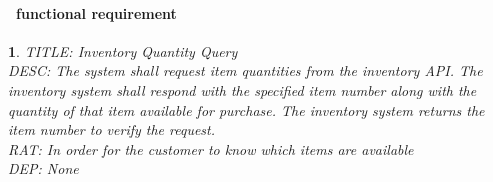 \documentclass{scrreprt}
\theoremstyle{funreq}
\newtheorem{funreq}{}
\newcommand*{\reqref}[1]{\hyperref[#1]{FR\ref*{#1}}}
\begin{document}
	\paragraph[]{\Subsectionname ~functional requirement }
	\begin{funreq}
		\label{inventory_quantity}
		TITLE: Inventory Quantity Query\\
		DESC: The system shall request item quantities from the inventory API.  The inventory system shall respond with the specified item number along with the quantity of that item available for purchase. The inventory system returns the item number to verify the request.\\
		RAT: In order for the customer to know which items are available\\
		DEP: None\\
	\end{funreq}
	
	
\end{document}
